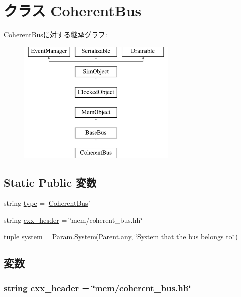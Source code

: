 \hypertarget{classBus_1_1CoherentBus}{
\section{クラス CoherentBus}
\label{classBus_1_1CoherentBus}
}
CoherentBusに対する継承グラフ:\begin{figure}[H]
\begin{center}
\leavevmode
\includegraphics[height=6cm]{classBus_1_1CoherentBus}
\end{center}
\end{figure}
\subsection*{Static Public 変数}
\begin{DoxyCompactItemize}
\item 
string \hyperlink{classBus_1_1CoherentBus_acce15679d830831b0bbe8ebc2a60b2ca}{type} = '\hyperlink{classBus_1_1CoherentBus}{CoherentBus}'
\item 
string \hyperlink{classBus_1_1CoherentBus_a17da7064bc5c518791f0c891eff05fda}{cxx\_\-header} = \char`\"{}mem/coherent\_\-bus.hh\char`\"{}
\item 
tuple \hyperlink{classBus_1_1CoherentBus_ab737471139f5a296e5b26e8a0e1b0744}{system} = Param.System(Parent.any, \char`\"{}System that the bus belongs to.\char`\"{})
\end{DoxyCompactItemize}


\subsection{変数}
\hypertarget{classBus_1_1CoherentBus_a17da7064bc5c518791f0c891eff05fda}{
\subsubsection[{cxx\_\-header}]{\setlength{\rightskip}{0pt plus 5cm}string {\bf cxx\_\-header} = \char`\"{}mem/coherent\_\-bus.hh\char`\"{}}}
\label{classBus_1_1CoherentBus_a17da7064bc5c518791f0c891eff05fda}


